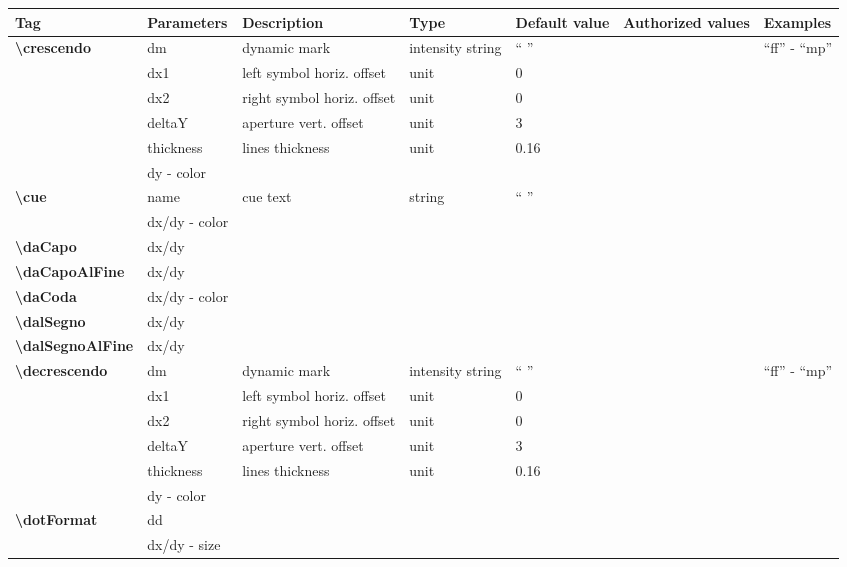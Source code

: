 \documentclass[a4paper, landscape, 10pt]{article}
\begin{document}
\begin{tabularx}{\linewidth}{p{3cm}p{3cm}p{5cm}p{3cm}p{2.5cm}p{3.5cm}p{4cm}}
    \hline
    \textbf{Tag}&\textbf{Parameters}&\textbf{Description}&\textbf{Type}&\textbf{Default value}&\textbf{Authorized values}&\textbf{Examples}\\
    \hline
    \textbf{\textbackslash{}crescendo}&dm&dynamic mark&intensity string&`` ''&&``ff'' - ``mp''\\
    &dx1&left symbol horiz. offset&unit&0&&\\
    &dx2&right symbol horiz. offset&unit&0&&\\
    &deltaY&aperture vert. offset&unit&3&&\\
    &thickness&lines thickness&unit&0.16&&\\
	&dy - color&&&&&\\
    \hline
    \textbf{\textbackslash{}cue}&name&cue text&string&`` ''&&\\
    &dx/dy - color&&&&&\\
    \hline
    \textbf{\textbackslash{}daCapo}&dx/dy&&&&&\\
    \hline
    \textbf{\textbackslash{}daCapoAlFine}&dx/dy&&&&&\\
    \hline
    \textbf{\textbackslash{}daCoda}&dx/dy - color&&&&&\\
    \hline
    \textbf{\textbackslash{}dalSegno}&dx/dy&&&&&\\
    \hline
    \textbf{\textbackslash{}dalSegnoAlFine}&dx/dy&&&&&\\
    \hline
    \textbf{\textbackslash{}decrescendo}&dm&dynamic mark&intensity string&`` ''&&``ff'' - ``mp''\\
    &dx1&left symbol horiz. offset&unit&0&&\\
    &dx2&right symbol horiz. offset&unit&0&&\\
    &deltaY&aperture vert. offset&unit&3&&\\
    &thickness&lines thickness&unit&0.16&&\\
    &dy - color&&&&&\\
    \hline    
    \textbf{\textbackslash{}dotFormat}&dd&&&&&\\ %
    &dx/dy - size&&&&&\\
    \hline

\end{tabularx}
\end{document}
